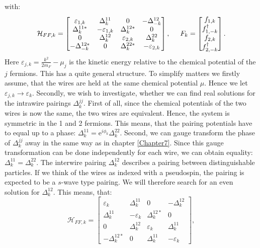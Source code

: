 with:
\begin{equation}
\mathcal{H}_{FF,k} = \begin{bmatrix} \varepsilon_{1,k} & \Delta^{11}_k      & 0                 & -\Delta^{12}_{-k} \\ 
                                     \Delta^{11 *}_k   & -\varepsilon_{1,k} & \Delta^{12*}_k    & 0 \\ 
                                    0                  & \Delta^{12}_k      & \varepsilon_{2,k} & \Delta^{22}_k \\ 
                                     -\Delta^{12*}_{-k}& 0                  & \Delta^{22*}_k    & -\varepsilon_{2,k} \end{bmatrix}, \hspace{0.5cm}
F_k =  \begin{bmatrix} f_{1,k} \\ f^\dagger_{1,-k} \\ f_{2,k} \\ f^\dagger_{2,-k} \end{bmatrix}.                                     
\end{equation}
Here $\varepsilon_{j,k} = \frac{k^2}{2m_F}-\mu_j$ is the kinetic energy relative to the chemical potential of the $j$ fermions. This has a quite general structure. To simplify matters we firstly assume, that the wires are held at the same chemical potential $\mu$. Hence we let $\varepsilon_{j,k} \to \varepsilon_k$. Secondly, we wish to investigate, whether we can find real solutions for the intrawire pairings $\Delta^{jj}_k$. First of all, since the chemical potentials of the two wires is now the same, the two wires are equivalent. Hence, the system is symmetric in the 1 and 2 fermions. This means, that the pairing potentials have to equal up to a phase: $\Delta^{11}_k = \text{e}^{i\phi_k} \Delta^{22}_k$. Second, we can gauge transform the phase of $\Delta^{jj}_k$ away in the same way as in chapter \ref{Chapter7}. Since this gauge transformation can be done independently for each wire, we can obtain equality: $\Delta^{11}_k = \Delta^{22}_k$. The interwire pairing $\Delta^{12}_k$ describes a pairing between distinguishable particles. If we think of the wires as indexed with a pseudospin, the pairing is expected to be a $s$-wave type pairing. We will therefore search for an even solution for $\Delta^{12}_k$. This means, that:
\begin{equation}
\mathcal{H}_{FF,k} = \begin{bmatrix} \varepsilon_{k}   & \Delta^{11}_k      & 0                 & -\Delta^{12}_{k} \\ 
                                     \Delta^{11}_k     & -\varepsilon_{k}   & \Delta^{12*}_k    & 0 \\ 
                                    0                  & \Delta^{12}_k      & \varepsilon_{k}   & \Delta^{11}_k \\ 
                                     -\Delta^{12*}_{k} & 0                  & \Delta^{11}_k     & -\varepsilon_{k} \end{bmatrix},                  
\end{equation}
